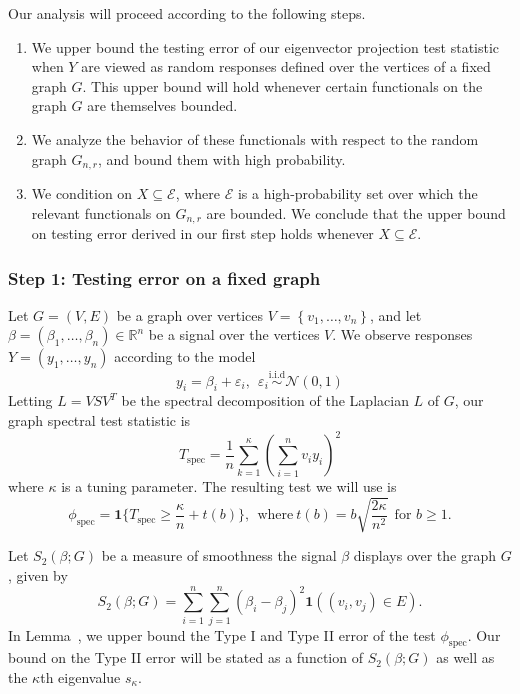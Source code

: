 \documentclass{article}
\newcommand{\Reals}{\mathbb{R}}
\newcommand{\set}[1]{\left\{#1\right\}}
\newcommand{\1}{\mathbf{1}}
\newcommand{\spec}{\mathrm{spec}}
\theoremstyle{alden}
\theoremstyle{aldenthm}
\theoremstyle{definition}
\theoremstyle{remark}
\begin{document}
Our analysis will proceed according to the following steps.
\begin{enumerate}
	\item We upper bound the testing error of our eigenvector projection test statistic when $Y$ are viewed as random responses defined over the vertices of a fixed graph $G$. This upper bound will hold whenever certain functionals on the graph $G$ are themselves bounded.
	\item We analyze the behavior of these functionals with respect to the random graph $G_{n,r}$, and bound them with high probability.
	\item We condition on $X \subseteq \mathcal{E}$, where $\mathcal{E}$ is a high-probability set over which the relevant functionals on $G_{n,r}$ are bounded. We conclude that the upper bound on testing error derived in our first step holds whenever $X \subseteq \mathcal{E}$. 
\end{enumerate}

\subsubsection{Step 1: Testing error on a fixed graph}

Let $G = (V,E)$ be a graph over vertices $V = \set{v_1,\ldots,v_n}$, and let $\beta = (\beta_1,\ldots,\beta_n) \in \Reals^n$ be a signal over the vertices $V$. We observe responses $Y = (y_1,\ldots,y_n)$ according to the model
\begin{equation*}
y_i = \beta_i + \varepsilon_i, ~~ \varepsilon_i \overset{\textrm{i.i.d}}{\sim} \mathcal{N}(0,1)
\end{equation*}
Letting $L = VSV^T$ be the spectral decomposition of the Laplacian $L$ of $G$, our graph spectral test statistic is 
\begin{equation*}
T_{\spec} = \frac{1}{n}\sum_{k = 1}^{\kappa} \left(\sum_{i = 1}^{n} v_i y_i\right)^2
\end{equation*}
where $\kappa$ is a tuning parameter. The resulting test we will use is
\begin{equation*}
\phi_{\spec} = \1\{T_{\spec} \geq \frac{\kappa}{n} + t(b)\},~~\textrm{where}~ t(b) = b\sqrt{\frac{2\kappa}{n^2}}~~\textrm{for $b \geq 1$.}
\end{equation*}

Let $S_2(\beta;G)$ be a measure of smoothness the signal $\beta$ displays over the graph $G$, given by
\begin{equation*}
S_2(\beta;G) = \sum_{i = 1}^{n} \sum_{j = 1}^{n} (\beta_i - \beta_j)^2 \1((v_i,v_j) \in E).
\end{equation*}
In Lemma~, we upper bound the Type I and Type II error of the test $\phi_{\spec}$. Our bound on the Type II error will be stated as a function of $S_2(\beta;G)$ as well as the $\kappa$th eigenvalue $s_{\kappa}$.
\end{document}
